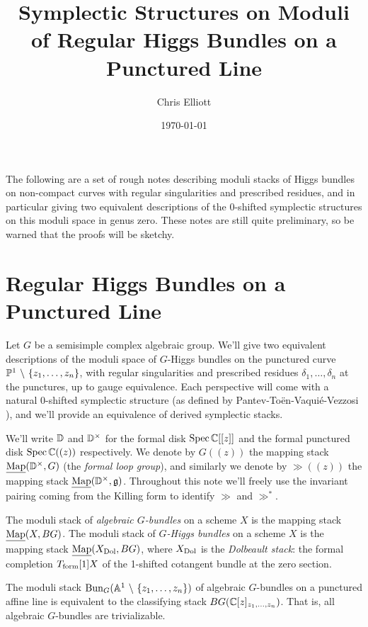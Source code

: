 \documentclass[10pt, oneside, a4paper]{article}
\title{Symplectic Structures on Moduli of Regular Higgs Bundles on a Punctured Line}
\author{Chris Elliott}
\date{\today}
\newcommand{\Map}{\ul{\mr{Map}}}
\begin{document}
\maketitle

The following are a set of rough notes describing moduli stacks of Higgs bundles on non-compact curves with regular singularities and prescribed residues, and in particular giving two equivalent descriptions of the 0-shifted symplectic structures on this moduli space in genus zero.  These notes are still quite preliminary, so be warned that the proofs will be sketchy.

\section{Regular Higgs Bundles on a Punctured Line}
Let $G$ be a semisimple complex algebraic group.  We'll give two equivalent descriptions of the moduli space of $G$-Higgs bundles on the punctured curve $\mathbb{P}^1 \ \backslash \  \{z_1, \ldots, z_n\}$, with regular singularities and prescribed residues $\delta_1, \ldots, \delta_n$ at the punctures, up to gauge equivalence.  Each perspective will come with a natural 0-shifted symplectic structure (as defined by Pantev-To\"en-Vaqui\'e-Vezzosi \cite{PTVV}), and we'll provide an equivalence of derived symplectic stacks.

We'll write $\mathbb{D}$ and $\mathbb{D}^\times$ for the formal disk $\operatorname{Spec} \mathbb{C}[[z]]$ and the formal punctured disk $\operatorname{Spec} \mathbb{C}((z))$ respectively.  We denote by $G((z))$ the mapping stack $\underline{\mathrm{Map}}(\mathbb{D}^\times, G)$ (the \emph{formal loop group}), and similarly we denote by $\gg((z))$ the mapping stack $\underline{\mathrm{Map}}(\mathbb{D}^\times, \mathfrak{g})$.  Throughout this note we'll freely use the invariant pairing coming from the Killing form to identify $\gg$ and $\gg^*$.

\begin{definition}
The moduli stack of \emph{algebraic $G$-bundles} on a scheme $X$ is the mapping stack $\Map(X, BG)$.  The moduli stack of \emph{$G$-Higgs bundles} on a scheme $X$ is the mapping stack $\Map(X_{\mr{Dol}}, BG)$, where $X_{\mathrm{Dol}}$ is the \emph{Dolbeault stack}: the formal completion $T_{\mathrm{form}}[1]X$ of the 1-shifted cotangent bundle at the zero section.
\end{definition}

\begin{lemma} \label{algebraic_bundles_vanish_lemma}
The moduli stack $\operatorname{Bun}_G(\mathbb{A}^1 \ \backslash \  \{z_1, \ldots, z_n\})$ of algebraic $G$-bundles on a punctured affine line is equivalent to the classifying stack $BG(\mathbb{C}[z]_{z_1, \ldots, z_n})$.  That is, all algebraic $G$-bundles are trivializable.
\end{lemma}
\end{document}
